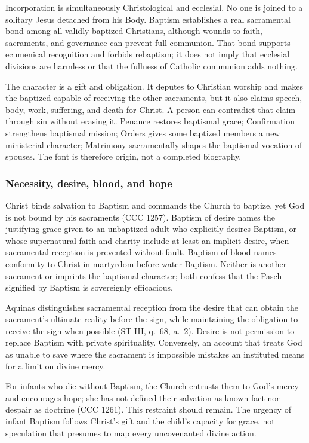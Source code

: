 Incorporation is simultaneously Christological and ecclesial. No one is joined to a solitary Jesus detached from his Body. Baptism establishes a real sacramental bond among all validly baptized Christians, although wounds to faith, sacraments, and governance can prevent full communion. That bond supports ecumenical recognition and forbids rebaptism; it does not imply that ecclesial divisions are harmless or that the fullness of Catholic communion adds nothing.

The character is a gift and obligation. It deputes to Christian worship and makes the baptized capable of receiving the other sacraments, but it also claims speech, body, work, suffering, and death for Christ. A person can contradict that claim through sin without erasing it. Penance restores baptismal grace; Confirmation strengthens baptismal mission; Orders gives some baptized members a new ministerial character; Matrimony sacramentally shapes the baptismal vocation of spouses. The font is therefore origin, not a completed biography.

\subsubsection{Necessity, desire, blood, and hope}

Christ binds salvation to Baptism and commands the Church to baptize, yet God is not bound by his sacraments (CCC 1257). Baptism of desire names the justifying grace given to an unbaptized adult who explicitly desires Baptism, or whose supernatural faith and charity include at least an implicit desire, when sacramental reception is prevented without fault. Baptism of blood names conformity to Christ in martyrdom before water Baptism. Neither is another sacrament or imprints the baptismal character; both confess that the Pasch signified by Baptism is sovereignly efficacious.

Aquinas distinguishes sacramental reception from the desire that can obtain the sacrament's ultimate reality before the sign, while maintaining the obligation to receive the sign when possible (ST III, q.~68, a.~2). Desire is not permission to replace Baptism with private spirituality. Conversely, an account that treats God as unable to save where the sacrament is impossible mistakes an instituted means for a limit on divine mercy.

For infants who die without Baptism, the Church entrusts them to God's mercy and encourages hope; she has not defined their salvation as known fact nor despair as doctrine (CCC 1261). This restraint should remain. The urgency of infant Baptism follows Christ's gift and the child's capacity for grace, not speculation that presumes to map every uncovenanted divine action.

